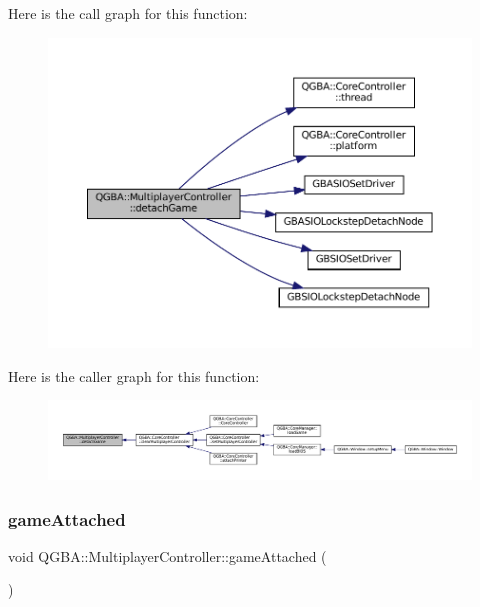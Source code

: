 Here is the call graph for this function\+:
\nopagebreak
\begin{figure}[H]
\begin{center}
\leavevmode
\includegraphics[width=350pt]{class_q_g_b_a_1_1_multiplayer_controller_a4527bd49027a633ca073fa002d7492b3_cgraph}
\end{center}
\end{figure}
Here is the caller graph for this function\+:
\nopagebreak
\begin{figure}[H]
\begin{center}
\leavevmode
\includegraphics[width=350pt]{class_q_g_b_a_1_1_multiplayer_controller_a4527bd49027a633ca073fa002d7492b3_icgraph}
\end{center}
\end{figure}
\mbox{\label{class_q_g_b_a_1_1_multiplayer_controller_ab2affa28eb8bec202428b5ccb7240e93}} 
\subsubsection{\texorpdfstring{game\+Attached}{gameAttached}}
{\footnotesize\ttfamily void Q\+G\+B\+A\+::\+Multiplayer\+Controller\+::game\+Attached (\begin{DoxyParamCaption}{ }\end{DoxyParamCaption})\hspace{0.3cm}{\ttfamily [signal]}}

